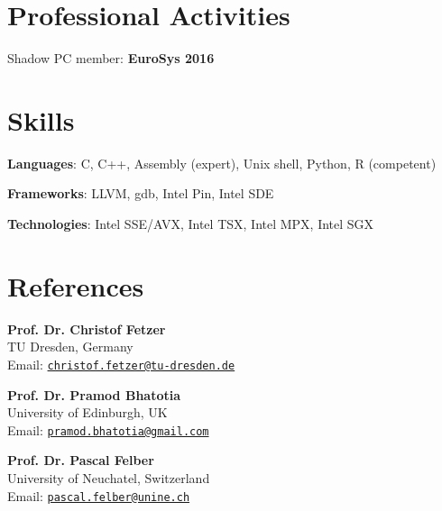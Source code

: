 \documentclass[letterpaper]{article}
\renewenvironment{itemize}{
  \begin{list}{}{
    \setlength{\leftmargin}{1.5em}
  }
}{
  \end{list}
}
\begin{document}
\section*{Professional Activities}


\begin{itemize}
 \item { Shadow PC member:} {\bf EuroSys 2016}
\end{itemize}
  

\section*{Skills}
\begin{itemize}
	\item {\bf Languages}: C, C++, Assembly (expert), Unix shell, Python, R (competent)
	\item {\bf Frameworks}: LLVM, gdb, Intel Pin, Intel SDE
	\item {\bf Technologies}: Intel SSE/AVX, Intel TSX, Intel MPX, Intel SGX
\end{itemize}


\section*{References}

\begin{itemize}

\item {\bf Prof. Dr. Christof Fetzer }  \\
TU Dresden, Germany\\
Email: \href{mailto:christof.fetzer@tu-dresden.de}{\tt christof.fetzer@tu-dresden.de}
      
\item {\bf  Prof. Dr. Pramod Bhatotia }  \\
University of Edinburgh, UK\\
Email: \href{mailto:pramod.bhatotia@gmail.com}{\tt pramod.bhatotia@gmail.com}

\item {\bf Prof. Dr. Pascal Felber} \\
University of Neuchatel, Switzerland\\
Email: \href{mailto:pascal.felber@unine.ch}{\tt pascal.felber@unine.ch}

\end{itemize}
\end{document}

